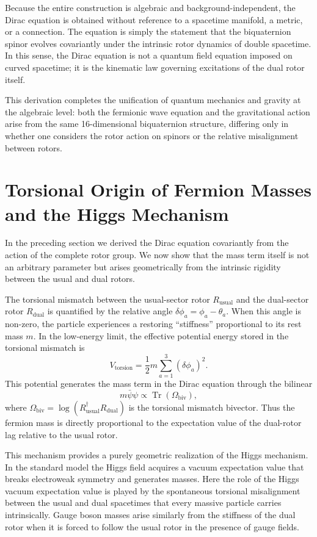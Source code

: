 \documentclass[dvipdfmx,11pt,a4paper]{article}
\begin{document}
Because the entire construction is algebraic and background-independent, the Dirac equation is obtained without reference to a spacetime manifold, a metric, or a connection. The equation is simply the statement that the biquaternion spinor evolves covariantly under the intrinsic rotor dynamics of double spacetime. In this sense, the Dirac equation is not a quantum field equation imposed on curved spacetime; it is the kinematic law governing excitations of the dual rotor itself.

This derivation completes the unification of quantum mechanics and gravity at the algebraic level: both the fermionic wave equation and the gravitational action arise from the same 16-dimensional biquaternion structure, differing only in whether one considers the rotor action on spinors or the relative misalignment between rotors.

\section{Torsional Origin of Fermion Masses and the Higgs Mechanism}
\label{sec:mass}

In the preceding section we derived the Dirac equation covariantly from the action of the complete rotor group. We now show that the mass term itself is not an arbitrary parameter but arises geometrically from the intrinsic rigidity between the usual and dual rotors.

The torsional mismatch between the usual-sector rotor $R_\text{usual}$ and the dual-sector rotor $R_\text{dual}$ is quantified by the relative angle $\delta\phi_a = \phi_a - \theta_a$. When this angle is non-zero, the particle experiences a restoring “stiffness” proportional to its rest mass $m$. In the low-energy limit, the effective potential energy stored in the torsional mismatch is
\[
V_\text{torsion} = \frac{1}{2} m \sum_{a=1}^3 (\delta\phi_a)^2.
\]
This potential generates the mass term in the Dirac equation through the bilinear
\[
m \bar{\psi}\psi \propto \operatorname{Tr}(\Omega_\text{biv}),
\]
where $\Omega_\text{biv} = \log(R_\text{usual}^\dagger R_\text{dual})$ is the torsional mismatch bivector. Thus the fermion mass is directly proportional to the expectation value of the dual-rotor lag relative to the usual rotor.

This mechanism provides a purely geometric realization of the Higgs mechanism. In the standard model the Higgs field acquires a vacuum expectation value that breaks electroweak symmetry and generates masses. Here the role of the Higgs vacuum expectation value is played by the spontaneous torsional misalignment between the usual and dual spacetimes that every massive particle carries intrinsically. Gauge boson masses arise similarly from the stiffness of the dual rotor when it is forced to follow the usual rotor in the presence of gauge fields.
\end{document}
